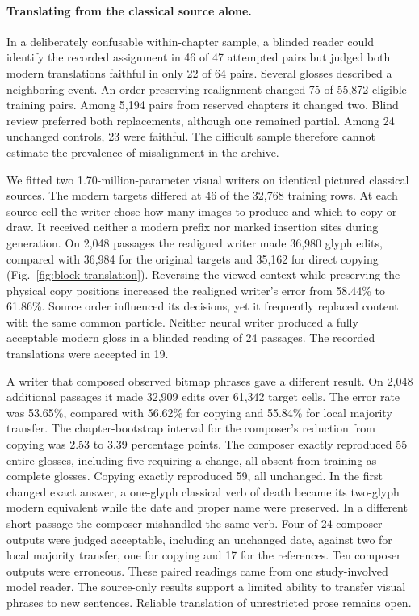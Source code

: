 \paragraph{Translating from the classical source alone.}
In a deliberately confusable within-chapter sample, a blinded reader could identify the recorded assignment in 46 of 47 attempted pairs but judged both modern translations faithful in only 22 of 64 pairs. Several glosses described a neighboring event. An order-preserving realignment changed 75 of 55,872 eligible training pairs. Among 5,194 pairs from reserved chapters it changed two. Blind review preferred both replacements, although one remained partial. Among 24 unchanged controls, 23 were faithful. The difficult sample therefore cannot estimate the prevalence of misalignment in the archive.

We fitted two 1.70-million-parameter visual writers on identical pictured classical sources. The modern targets differed at 46 of the 32,768 training rows. At each source cell the writer chose how many images to produce and which to copy or draw. It received neither a modern prefix nor marked insertion sites during generation. On 2,048 passages the realigned writer made 36,980 glyph edits, compared with 36,984 for the original targets and 35,162 for direct copying (Fig.~\ref{fig:block-translation}). Reversing the viewed context while preserving the physical copy positions increased the realigned writer's error from 58.44\% to 61.86\%. Source order influenced its decisions, yet it frequently replaced content with the same common particle. Neither neural writer produced a fully acceptable modern gloss in a blinded reading of 24 passages. The recorded translations were accepted in 19.

A writer that composed observed bitmap phrases gave a different result. On 2,048 additional passages it made 32,909 edits over 61,342 target cells. The error rate was 53.65\%, compared with 56.62\% for copying and 55.84\% for local majority transfer. The chapter-bootstrap interval for the composer's reduction from copying was 2.53 to 3.39 percentage points. The composer exactly reproduced 55 entire glosses, including five requiring a change, all absent from training as complete glosses. Copying exactly reproduced 59, all unchanged. In the first changed exact answer, a one-glyph classical verb of death became its two-glyph modern equivalent while the date and proper name were preserved. In a different short passage the composer mishandled the same verb. Four of 24 composer outputs were judged acceptable, including an unchanged date, against two for local majority transfer, one for copying and 17 for the references. Ten composer outputs were erroneous. These paired readings came from one study-involved model reader. The source-only results support a limited ability to transfer visual phrases to new sentences. Reliable translation of unrestricted prose remains open.

